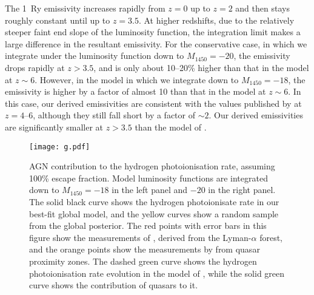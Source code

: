 \documentclass[a4paper,fleqn,usenatbib]{mnras}
\begin{document}
The 1~Ry emissivity increases rapidly from $z=0$ up to $z=2$ and then
stays roughly constant until up to $z=3.5$.  At higher redshifts, due
to the relatively steeper faint end slope of the luminosity function,
the integration limit makes a large difference in the resultant
emissivity.  For the conservative case, in which we integrate under
the luminosity function down to $M_{1450}=-20$, the emissivity drops
rapidly at $z>3.5$, and is only about 10--20\% higher than that in the
\citet{2012ApJ...746..125H} model at $z\sim 6$.  However, in the model
in which we integrate down to $M_{1450}=-18$, the emissivity is higher
by a factor of almost 10 than that in the \citet{2012ApJ...746..125H}
model at $z\sim 6$.  In this case, our derived emissivities are
consistent with the values published by \citet{2015AA...578A..83G} at
$z=4$--$6$, although they still fall short by a factor of $\sim 2$.
Our derived emissivities are significantly smaller at $z>3.5$ than the
model of \citet{2015ApJ...813L...8M}.


\begin{figure*}
  \begin{center}
    \texttt{[image: g.pdf]}
  \end{center}
  \caption{AGN contribution to the hydrogen photoionisation rate,
    assuming 100\% escape fraction.  Model luminosity functions are
    integrated down to $M_{1450}=-18$ in the left panel and $-20$ in
    the right panel.  The solid black curve shows the hydrogen
    photoionisate rate in our best-fit global model, and the yellow
    curves show a random sample from the global posterior.  The red
    points with error bars in this figure show the measurements of
    \citet{2013MNRAS.436.1023B}, derived from the Lyman-$\alpha$
    forest, and the orange points show the measurements by
    \citet{2011MNRAS.412.2543C} from quasar proximity zones.  The
    dashed green curve shows the hydrogen photoionisation rate
    evolution in the model of \citet{2012ApJ...746..125H}, while the
    solid green curve shows the contribution of quasars to it. }
  \label{fig:gammapi}
\end{figure*}
\end{document}
